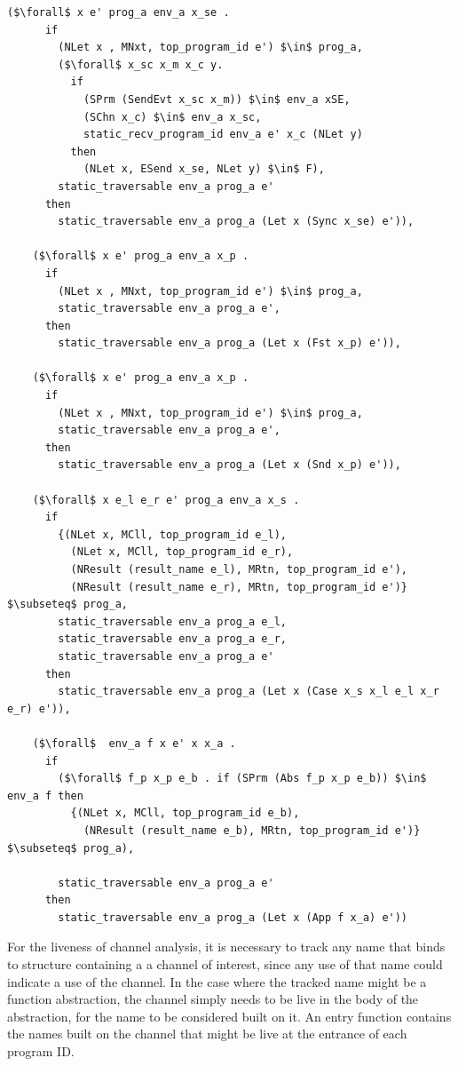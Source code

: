\documentclass{article}
\begin{document}
\begin{lstlisting}[language=logic, mathescape]
    ($\forall$ x e' prog_a env_a x_se .
      if
        (NLet x , MNxt, top_program_id e') $\in$ prog_a,
        ($\forall$ x_sc x_m x_c y.
          if
            (SPrm (SendEvt x_sc x_m)) $\in$ env_a xSE, 
            (SChn x_c) $\in$ env_a x_sc,
            static_recv_program_id env_a e' x_c (NLet y)
          then
            (NLet x, ESend x_se, NLet y) $\in$ F),
        static_traversable env_a prog_a e'
      then
        static_traversable env_a prog_a (Let x (Sync x_se) e')),

    ($\forall$ x e' prog_a env_a x_p .
      if
        (NLet x , MNxt, top_program_id e') $\in$ prog_a,
        static_traversable env_a prog_a e',
      then
        static_traversable env_a prog_a (Let x (Fst x_p) e')),

    ($\forall$ x e' prog_a env_a x_p .
      if
        (NLet x , MNxt, top_program_id e') $\in$ prog_a,
        static_traversable env_a prog_a e',
      then
        static_traversable env_a prog_a (Let x (Snd x_p) e')),

    ($\forall$ x e_l e_r e' prog_a env_a x_s .
      if
        {(NLet x, MCll, top_program_id e_l),
          (NLet x, MCll, top_program_id e_r),
          (NResult (result_name e_l), MRtn, top_program_id e'),
          (NResult (result_name e_r), MRtn, top_program_id e')} $\subseteq$ prog_a,
        static_traversable env_a prog_a e_l,
        static_traversable env_a prog_a e_r,
        static_traversable env_a prog_a e'
      then
        static_traversable env_a prog_a (Let x (Case x_s x_l e_l x_r e_r) e')),
        
    ($\forall$  env_a f x e' x x_a .
      if
        ($\forall$ f_p x_p e_b . if (SPrm (Abs f_p x_p e_b)) $\in$ env_a f then 
          {(NLet x, MCll, top_program_id e_b),
            (NResult (result_name e_b), MRtn, top_program_id e')} $\subseteq$ prog_a),

        static_traversable env_a prog_a e'
      then
        static_traversable env_a prog_a (Let x (App f x_a) e'))
  \end{lstlisting}


For the liveness of channel analysis, it is necessary to track any name that binds to structure
containing a a channel of interest, since any use of that name could indicate a use of the
channel. In the case where the tracked name might be a function abstraction, the channel simply
needs to be live in the body of the abstraction, for the name to be considered built on it.
An entry function contains the names built on the channel that might be live at the entrance
of each program ID.
\end{document}

